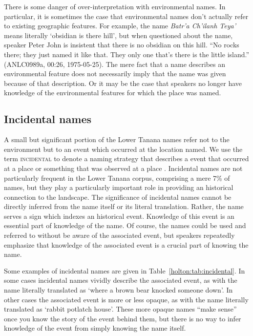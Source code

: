 There is some danger of over-interpretation with environmental names. In particular, it is sometimes the case that environmental names don’t actually refer to existing geographic features. For example, the name \textit{Batr’a Ch’ilanh Teya’} means literally ‘obsidian is there hill’, but when questioned about the name, speaker Peter John is insistent that there is no obsidian on this hill. “No rocks there; they just named it like that. They only one that’s there is the little island.” (ANLC0989a, 00:26, 1975-05-25). The mere fact that a name describes an environmental feature does not necessarily imply that the name was given because of that description. Or it may be the case that speakers no longer have knowledge of the environmental features for which the place was named.

\subsection{Incidental names}
A small but significant portion of the Lower Tanana names refer not to the environment but to an event which occurred at the location named. We use the term \textsc{incidental} to denote a naming strategy that describes a event that occurred at a place or something that was observed at a place \citep[cf.][]{goehring1990}. Incidental names are not particularly frequent in the Lower Tanana corpus, comprising a mere 7\% of names, but they play a particularly important role in providing an historical connection to the landscape. The significance of incidental names cannot be directly inferred from the name itself or its literal translation. Rather, the name serves a sign which indexes an historical event. Knowledge of this event is an essential part of knowledge of the name. Of course, the names could be used and referred to without be aware of the associated event, but speakers repeatedly emphasize that knowledge of the associated event is a crucial part of knowing the name.

Some examples of incidental names are given in Table~\ref{holton:tab:incidental}. In some cases incidental names vividly describe the associated event, as with the name literally translated as ‘where a brown bear knocked someone down’. In other cases the associated event is more or less opaque, as with the name literally translated as ‘rabbit potlatch house’. These more opaque names “make sense” once you know the story of the event behind them, but there is no way to infer knowledge of the event from simply knowing the name itself.


